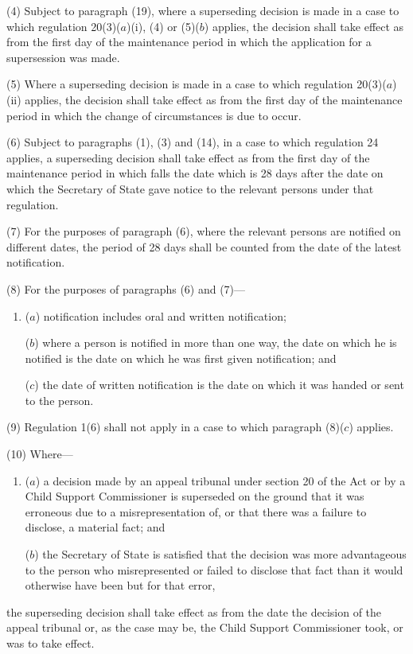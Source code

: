 \documentclass[a4paper,12pt]{article}
\begin{document}
(4) 
Subject to paragraph (19), where a superseding decision is made  %
in a case to which regulation 20(3)($a$)(i), (4) or (5)($b$) applies, the decision shall take effect as from the first day of the maintenance period in which the application for a supersession was made.

(5) Where a superseding decision is made in a case to which regulation 20(3)($a$)(ii) applies, the decision shall take effect as from the first day of the maintenance period in which the change of circumstances is due to occur.

(6) Subject to paragraphs (1), (3) and (14), in a case to which regulation 24 applies, a superseding decision shall take effect as from the first day of the maintenance period in which falls the date which is 28 days after the date on which the Secretary of State gave notice to the relevant persons under that regulation.

(7) For the purposes of paragraph (6), where the relevant persons are notified on different dates, the period of 28 days shall be counted from the date of the latest notification.

(8) For the purposes of paragraphs (6) and (7)---
\begin{enumerate}\item[]
($a$) notification includes oral and written notification;

($b$) where a person is notified in more than one way, the date on which he is notified is the date on which he was first given notification; and

($c$) the date of written notification is the date on which it was handed or sent to the person.
\end{enumerate}

(9) Regulation 1(6) shall not apply in a case to which paragraph (8)($c$) applies.

(10) Where---
\begin{enumerate}\item[]
($a$) a decision made by an appeal tribunal under section 20 of the Act or by a Child Support Commissioner is superseded on the ground that it was erroneous due to a misrepresentation of, or that there was a failure to disclose, a material fact; and

($b$) the Secretary of State is satisfied that the decision was more advantageous to the person who misrepresented or failed to disclose that fact than it would otherwise have been but for that error,
\end{enumerate}
the superseding decision shall take effect as from the date the decision of the appeal tribunal or, as the case may be, the Child Support Commissioner took, or was to take effect.
\end{document}
